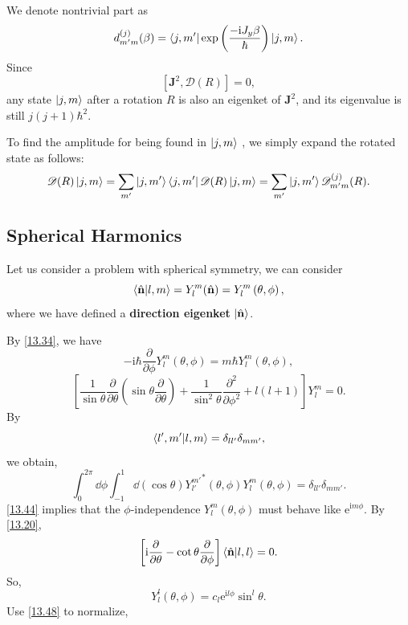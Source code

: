 \documentclass{article}
\theoremstyle{1}
\newcommand{\pa}{\partial}
\newcommand{\ii}{\mathrm{i}}
\newcommand{\ee}{\mathrm{e}}
\begin{document}
We denote nontrivial part as 
\begin{equation}
    d^{(j)}_{m'm}(\beta)=\bra{j,m'}\exp\left(\frac{-\ii J_y \beta}{\hbar}\right)\ket{j,m}.
\end{equation}
Since 
\begin{equation}
    \left[\mathbf{J}^2,\mathscr{D}(R)\right]=0,
\end{equation}
any state $\ket{j,m}$ after a rotation $R$ is also an eigenket of $\mathbf{J}^2$, and its eigenvalue is still $j(j+1)\hbar^2$.

To find the amplitude for being found in $\ket{j,m}$ , we simply expand the rotated state as follows:
\begin{equation}
    \mathscr{D}(R)\ket{j,m}=\sum_{m'}\ket{j,m'}\bra{j,m'}\mathscr{D}(R)\ket{j,m}=\sum_{m'}\ket{j,m'}\mathscr{D}^{(j)}_{m'm}(R).
\end{equation}


\subsection{Spherical Harmonics}
Let us consider a problem with spherical symmetry, we can consider
\begin{equation}
    \bra{\hat{\mathbf{n}}}\ket{l,m}=Y_l^m(\hat{\mathbf{n}})=Y_l^m\left(\theta,\phi\right),
\end{equation}
where we have defined a \textbf{direction eigenket} $\ket{\hat{\mathbf{n}}}$.

By \eqref{13.34}, we have 
\begin{equation}\label{13.44}
    -\ii \hbar \frac{\pa}{\pa \phi}Y_l^m\left(\theta,\phi\right)=m\hbar Y_l^m\left(\theta,\phi\right),
\end{equation}
\begin{equation}
    \left[\frac{1}{\sin \theta}\frac{\pa}{\pa \theta}\left(\sin\theta\frac{\pa}{\pa \theta}\right)+\frac{1}{\sin^2\theta}\frac{\pa^2}{\pa \phi^2}+l\left(l+1\right)\right]Y_l^m=0.
\end{equation}
By 
\begin{equation}
    \bra{l',m'}\ket{l,m}=\delta_{ll'}\delta_{mm'},
\end{equation}
we obtain,
\begin{equation}\label{13.48}
    \int_{0}^{2\pi}\dd{\phi}\int_{-1}^{1}\dd{(\cos\theta)}{Y_{l'}^{m'}}^*\left(\theta,\phi\right)Y^m_l\left(\theta,\phi\right)=\delta_{ll'}\delta_{mm'}.
\end{equation}
\eqref{13.44} implies that the $\phi$-independence $Y_l^m\left(\theta,\phi\right)$ must behave like $\ee^{\ii m \phi}$. By \eqref{13.20},
\begin{equation}
    \left[\ii \frac{\pa }{\pa \theta}-\cot\theta\frac{\pa}{\pa \phi}\right]\braket{\hat{\mathbf{n}}}{l,l}=0.
\end{equation}
So, 
\begin{equation}
    Y_l^l\left(\theta,\phi\right)=c_l\ee^{\ii l\phi}\sin^l\theta.
\end{equation}
Use \eqref{13.48} to normalize,
\end{document}
